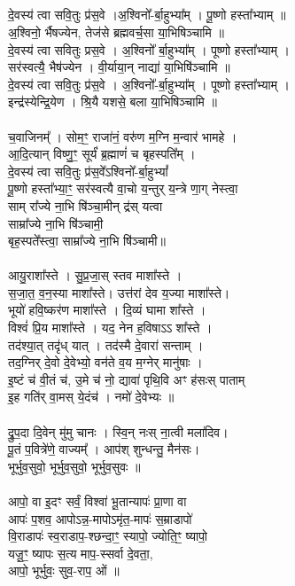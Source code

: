 \subsection{}
दे॒वस्य॑ त्वा सवि॒तुः प्र॑स॒वे ।अ॒श्विनो᳚-र्बा॒हुभ्या᳚म् । पू॒ष्णो हस्ता᳚भ्याम् ॥\\
अ॒श्विनो॒ र्भैषज्येन,  तेज॑से ब्रह्मवर्च॒सा या॒भिषिञ्चामि ॥ \\
दे॒वस्य॑ त्वा सवितुः प्रस॒वे । अ॒श्विनो᳚ र्बा॒हुभ्या᳚म् । पूष्णो हस्ता᳚भ्याम् ।\\
सर॑स्वत्यै॒ भैष॑ज्येन । वी॒र्याया॒न् नाद्या॑ या॒भिषि॑ञ्चामि ॥ \\
दे॒वस्य॑ त्वा सवि॒तुः प्र॑स॒वे । अ॒श्विनो᳚-र्बा॒हुभ्या᳚म् । पूष्णो हस्ता᳚भ्याम् ।\\
इन्द्र॑स्येन्द्रि॒येण । श्रि॒यै यशसे॒ बला या॒भिषिञ्चामि ॥\\
\\
च॒वाजिनम्᳚ । सोम॒ꣳ॒ राजा॑नं॒ वरु॑ण म॒ग्नि म॒न्वार॑ भामहे ।\\
आ॒दि॒त्यान् विष्णु॒ꣳ॒ सूर्यं॑ ब्र॒ह्माणं॑ च बृहस्पति᳚म् ।\\
दे॒वस्य॑ त्वा सवि॒तुः प्र॑स॒वे᳚ऽश्विनो᳚-र्बा॒हुभ्यां᳚ \\
पू॒ष्णो हस्ता᳚भ्या॒ꣳ॒ सर॑स्वत्यै वा॒चो य॒न्तुर् य॒न्त्रे णा॒ग् नेस्त्वा॒ \\
साम् रा᳚ज्ये ना॒भि षि॑ञ्चा॒मीन् द्र॑स् यत्वा \\
साम्रा᳚ज्ये ना॒भि षि॑ञ्चामी॒\\
बृह॒स्पते᳚स्त्वा॒ साम्रा᳚ज्ये ना॒भि षि॑ञ्चामी॥\\
\\
आयु॒राशा᳚स्ते । सु॒प्र॒जा॒स् स्तव माशा᳚स्ते ।\\
स॒जा॒त॒ व॒न॒स्या माशा᳚स्ते। उत्त॑रां देव य॒ज्या माशा᳚स्ते। \\
भूयो॑ हवि॒ष्कर॑ण माशा᳚स्ते । दि॒व्यं घामा शा᳚स्ते ।\\
विश्वं॑ प्रि॒य माशा᳚स्ते । यद॒ नेन ह॒विषाऽऽ शा᳚स्ते ।\\
तद॑श्या॒त् तदृ॑ध् यात् । तद॑स्मै दे॒वारा॑ सन्ताम् ।\\
तद॒ग्निर् दे॒वो दे॒वेभ्यो॒ वन॑ते व॒य म॒ग्नेर् मानु॑षाः ।\\
इ॒ष्टं च॑ वी॒तं च॑, उ॒मे च॑ नो॒ द्यावा॑ पृथि॒वि अꣳ ह॑सःस् पाताम् \\
इ॒ह गति॑र् वा॒मस् ये॒दंच॑ । नमो॑ दे॒वेभ्यः ॥\\
\\
द्रु॒प॒दा दि॒वेन् मु॑मु चानः । स्वि॒न् नःस् ना॒त्वी मला॑दिव। \\
पू॒तं प॒वित्रे॑णे॒ वाज्यम्᳚ । आप॑श् शुन्धन्तु॒ मैन॑सः। \\
भूर्भुव॒सुवो॒ भूर्भुव॒सुवो॒ भूर्भुव॒सुवः ॥\\
\\
आपो॒ वा इ॒दꣳ सर्वं॒ विश्वा॑ भू॒तान्यापः॑ प्रा॒णा वा \\
आपः॑ प॒शव॒ आपोऽन्न॒-मापोऽमृ॑त॒-मापः॑ स॒म्राडापो॑ \\
वि॒राडापः॑ स्व॒राडाप॒-श्छन्दा॒ꣳ॒ स्यापो॒ ज्योति॒ꣳ॒ ष्यापो॒ \\
यजू॒ꣳ॒ ष्यापः स॒त्य माप॒-स्सर्वा दे॒वता॒,\\
आपो॒ भूर्भुवः॒ सुव॒-राप॒ ओं ॥\\
